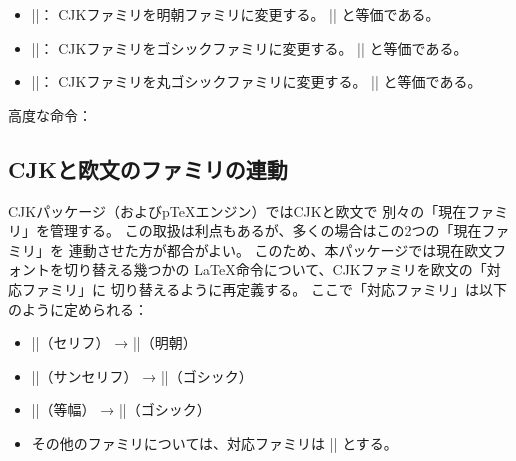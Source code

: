 \documentclass[a4paper]{ltjsarticle}
\newcommand{\Pkg}[1]{\textsf{#1}}
\newcommand{\Meta}[1]{$\langle$\mbox{}#1\mbox{}$\rangle$}
\newcommand{\Means}{：\quad}
\providecommand{\pTeX}{p\TeX}
\begin{document}
\begin{itemize}
\item |\mcfamily|\Means
  CJKファミリを明朝ファミリに変更する。
  || と等価である。
\item |\gtfamily|\Means
  CJKファミリをゴシックファミリに変更する。
  || と等価である。
\item |\mgfamily|\Means
  CJKファミリを丸ゴシックファミリに変更する。
  || と等価である。
\end{itemize}

高度な命令\Means


\subsection{CJKと欧文のファミリの連動}
\label{ssec:sync-families}

\Pkg{CJK}パッケージ（および{\pTeX}エンジン）ではCJKと欧文で
別々の「現在ファミリ」を管理する。
この取扱は利点もあるが、多くの場合はこの2つの「現在ファミリ」を
連動させた方が都合がよい。
このため、本パッケージでは現在欧文フォントを切り替える幾つかの
{\LaTeX}命令について、CJKファミリを欧文の「対応ファミリ」に
切り替えるように再定義する。
ここで「対応ファミリ」は以下のように定められる：

\begin{itemize}
\item |\rmfamily|（セリフ） → |\mcfamily|（明朝）
\item |\sffamily|（サンセリフ） → |\gtfamily|（ゴシック）
\item |\ttfamily|（等幅） → |\gtfamily|（ゴシック）
\item その他のファミリについては、対応ファミリは |\mcfamily| とする。
\end{itemize}
\end{document}
